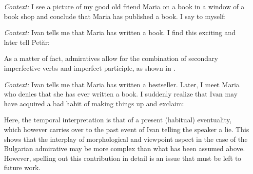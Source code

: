 \documentclass[output=paper,
colorlinks,
citecolor=brown,
newtxmath
]{langscibook}
\begin{document}
    \largerpage[-1]

\eanoraggedright\label{ex:napisala} \textit{Context:} I see a picture of my good old friend Maria on a book in a window of a book shop and conclude that Maria has published a book. I say to myself:\vspace{-6pt}
\z
\begin{exe}
\end{exe}

\eanoraggedright\label{ex:napisala2} \textit{Context:} Ivan tells me that Maria has written a book. I find this exciting and later tell Petăr:\vspace{-6pt}
\z
\begin{exe}
\end{exe}

\noindent As a matter of fact, admiratives allow for the combination of secondary imperfective verbs and imperfect participle, as shown in .

\eanoraggedright\label{ex:izmisljal} \textit{Context:} Ivan tells me that Maria has written a bestseller. Later, I meet Maria who denies that she has ever written a book. I suddenly realize that Ivan may have acquired a bad habit of making things up and exclaim:\vspace{-6pt}
\z
\begin{exe}
\end{exe}

\noindent Here, the temporal interpretation is that of a present (habitual) eventuality, which however carries over to the past event of Ivan telling the speaker a lie. This shows that the interplay of morphological and viewpoint aspect in the case of the Bulgarian admirative may be more complex than what has been assumed above. However, spelling out this contribution in detail is an issue that must be left to future work.
\end{document}
